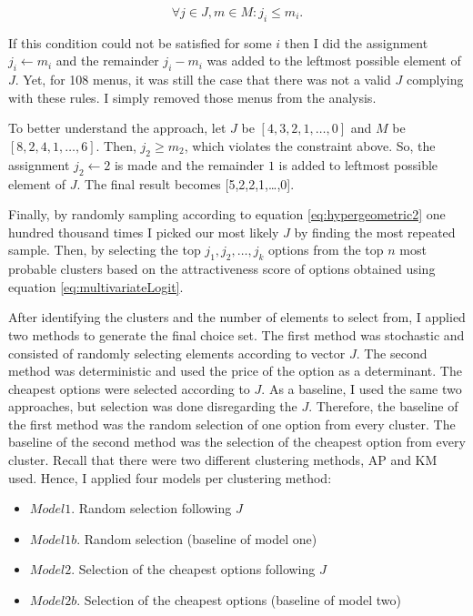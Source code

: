 \documentclass[a4paper,12pt]{article}
\begin{document}
$$ \forall j \in J,m \in M: j_i\le m_i.$$

If this condition could not be satisfied for some $i$ then I did the assignment ${j_i\gets m_i}$ and the remainder $j_i-m_i$ was added to the leftmost possible element of $J$.  Yet, for 108 menus, it was still the case that there was not a valid $J$ complying with these rules. I simply removed those menus from the analysis. 

To better understand the approach, let $J$ be $[4, 3, 2, 1,\ldots,0]$ and $M$ be $[8, 2, 4, 1,\dots, 6]$. Then, $j_2\geq m_2$, which violates the constraint above. So, the assignment $j_2\gets2$ is made and the remainder $1$ is added to leftmost possible element of $J$. The final result becomes [5,2,2,1,\ldots,0].

Finally, by randomly sampling according to equation \ref{eq:hypergeometric2} one hundred thousand times I picked our most likely $J$ by finding the most repeated sample. Then, by selecting the top $j_1, j_2, \dots, j_k$ options from the top $n$ most probable clusters based on the attractiveness score of options obtained using equation \ref{eq:multivariateLogit}.

After identifying the clusters and the number of elements to select from, I applied two methods to generate the final choice set. The first method was stochastic and consisted of randomly selecting elements according to vector $J$. The second method was deterministic and used the price of the option as a determinant. The cheapest options were selected according to $J$. As a baseline, I used the same two approaches, but selection was done disregarding the $J$. Therefore, the baseline of the first method was the random selection of one option from every cluster. The baseline of the second method was the selection of the cheapest option from every cluster. Recall that there were two different clustering methods, AP and KM used. Hence, I applied four models per clustering method:

\begin{itemize}
    \item $Model 1$. Random selection following $J$
    \item $Model 1b$. Random selection (baseline of model one)
    \item $Model 2$. Selection of the cheapest options following $J$
    \item $Model 2b$. Selection of the cheapest options (baseline of model two)
\end{itemize}
\end{document}
